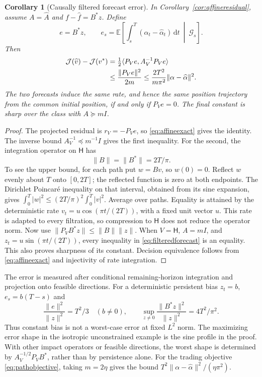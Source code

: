 \documentclass[11pt]{article}
\theoremstyle{plain}
\newtheorem{corollary}[theorem]{Corollary}
\theoremstyle{definition}
\theoremstyle{remark}
\newcommand{\E}{\mathbb E}
\newcommand{\dd}{\,\mathrm d}
\newcommand{\norm}[1]{\lVert#1\rVert}
\newcommand{\ip}[2]{\langle#1,#2\rangle}
\begin{document}
\begin{corollary}[Causally filtered forecast error]
\label{cor:filteredforecast}
In Corollary~\ref{cor:affineresidual}, assume
\(A=\widehat A\) and \(f-\widehat f=B^\ast z\). Define
\[
e=B^\ast z,\qquad
e_s=\E\left[\int_s^T(\alpha_t-\widehat\alpha_t)\dd t
                              \ \middle|\ \mathcal G_s\right].
\]
Then
\begin{align}
\mathcal J(\widehat v)-\mathcal J(v^\ast)
&=\tfrac12\ip{P_Ve}{A_V^{-1}P_Ve}\notag\\
&\le\frac{\norm{P_Ve}^2}{2m}
\le\frac{2T^2}{m\pi^2}\norm{\alpha-\widehat\alpha}^2.
\label{eq:filteredforecast}
\end{align}
The two forecasts induce the same rate, and hence the same position
trajectory from the common initial position, if and only if
\(P_Ve=0\). The final constant is sharp over the class with
\(A\succeq mI\).
\end{corollary}
\begin{proof}
The projected residual is \(r_V=-P_Ve\), so
\eqref{eq:affineexact} gives the identity. The inverse bound
\(A_V^{-1}\preceq m^{-1}I\) gives the first inequality.
For the second, the integration operator on \(\mathsf H\) has
\begin{equation}\label{eq:sharpvolterra}
\norm B=\norm{B^\ast}=2T/\pi.
\end{equation}
To see the upper bound, for each path put \(w=Bv\), so \(w(0)=0\).
Reflect \(w\) evenly about \(T\) onto \([0,2T]\); the reflected
function is zero at both endpoints. The Dirichlet Poincar\'e inequality
on that interval, obtained from its sine expansion, gives
\(\int_0^T|w|^2\le(2T/\pi)^2\int_0^T|v|^2\).
Average over paths. Equality is attained by the deterministic rate
\(v_t=u\cos(\pi t/(2T))\), with a fixed unit vector \(u\).
This rate is adapted to every filtration, so compression to
\(\mathsf H\) does not reduce the operator norm.
Now use \(\norm{P_VB^\ast z}\le\norm B\norm z\).
When \(V=\mathsf H\), \(A=mI\), and
\(z_t=u\sin(\pi t/(2T))\), every inequality in
\eqref{eq:filteredforecast} is an equality. This also proves
sharpness of its constant. Decision equivalence follows from
\eqref{eq:affineexact} and injectivity of rate integration.
\end{proof}

The error is measured after conditional remaining-horizon integration
and projection onto feasible directions. For a deterministic persistent
bias \(z_t=b\), \(e_s=b(T-s)\) and
\[
\frac{\norm e^2}{\norm z^2}=T^2/3
\quad(b\ne0),\qquad
\sup_{z\ne0}\frac{\norm{B^\ast z}^2}{\norm z^2}=4T^2/\pi^2.
\]
Thus constant bias is not a worst-case error at fixed \(L^2\) norm.
The maximizing error shape in the isotropic unconstrained example is
the sine profile in the proof. With other impact operators or feasible
directions, the worst shape is determined by
\(A_V^{-1/2}P_VB^\ast\), rather than by persistence alone.
For the trading objective \eqref{eq:pathobjective}, taking
\(m=2\eta\) gives the bound
\(T^2\norm{\alpha-\widehat\alpha}^2/(\eta\pi^2)\).
\end{document}
